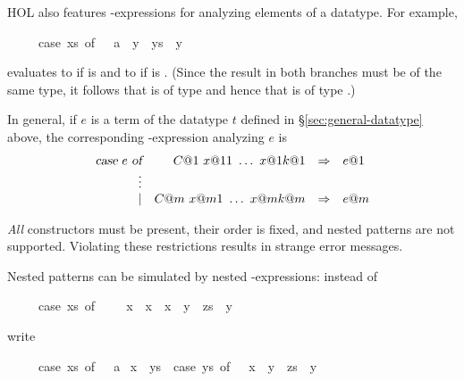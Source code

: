 %
\begin{isabellebody}%
\def\isabellecontext{case{\isacharunderscore}exprs}%
\isamarkupfalse%
%
\isamarkuptrue%
%
\begin{isamarkuptext}%
\label{sec:case-expressions}%
HOL also features -expressions for analyzing
elements of a datatype. For example,
\begin{isabelle}%
\ \ \ \ \ case\ xs\ of\ {\isacharbrackleft}{\isacharbrackright}\ {\isasymRightarrow}\ {}{\isasymColon}{\isacharprime}a\ {\isacharbar}\ y\ {\isacharhash}\ ys\ {\isasymRightarrow}\ y%
\end{isabelle}
evaluates to  if  is \isa{{\isacharbrackleft}{\isacharbrackright}} and to  if 
 is . (Since the result in both branches must be of
the same type, it follows that  is of type  and hence
that  is of type .)

In general, if $e$ is a term of the datatype $t$ defined in
\S\ref{sec:general-datatype} above, the corresponding
-expression analyzing $e$ is
\[
\begin{array}{rrcl}
\emph{\sl case}~e~\emph{\sl of} & C@1~x@ {11}~\dots~x@ {1k@1} & \Rightarrow & e@1 \\
                           \vdots \\
                           \mid & C@m~x@ {m1}~\dots~x@ {mk@m} & \Rightarrow & e@m
\end{array}
\]

\begin{warn}
\emph{All} constructors must be present, their order is fixed, and nested
patterns are not supported.  Violating these restrictions results in strange
error messages.
\end{warn}
\noindent
Nested patterns can be simulated by nested -expressions: instead
of
\begin{isabelle}%
\ \ \ \ \ case\ xs\ of\ {\isacharbrackleft}{\isacharbrackright}\ {\isacharequal}{\isachargreater}\ {}\ {\isacharbar}\ {\isacharbrackleft}x{\isacharbrackright}\ {\isacharequal}{\isachargreater}\ x\ {\isacharbar}\ x\ {\isacharhash}\ {\isacharparenleft}y\ {\isacharhash}\ zs{\isacharparenright}\ {\isacharequal}{\isachargreater}\ y%
\end{isabelle}
write
\begin{isabelle}%
\ \ \ \ \ case\ xs\ of\ {\isacharbrackleft}{\isacharbrackright}\ {\isasymRightarrow}\ {}{\isasymColon}{\isacharprime}a\isanewline
\isaindent{\ \ \ \ \ }{\isacharbar}\ x\ {\isacharhash}\ ys\ {\isasymRightarrow}\ case\ ys\ of\ {\isacharbrackleft}{\isacharbrackright}\ {\isasymRightarrow}\ x\ {\isacharbar}\ y\ {\isacharhash}\ zs\ {\isasymRightarrow}\ y%
\end{isabelle}


\end{isamarkuptext}
\end{isabellebody}
